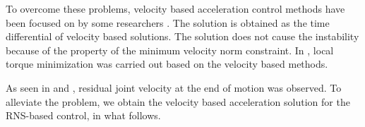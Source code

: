 To overcome these problems,
velocity based acceleration control methods have been focused on
by some researchers \cite{Ma1996,Watanabe2001,ShugenMa1996}.
The solution is obtained as the time differential of velocity based solutions.
The solution does not cause the instability
because of the property of the minimum velocity norm constraint.
In \cite{ShugenMa1996},
local torque minimization was carried out based on the velocity based methods.

As seen in  and ,
residual joint velocity at the end of motion was observed.
To alleviate the problem,
we obtain the velocity based acceleration solution for the RNS-based control, in what follows.


